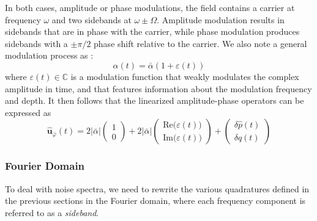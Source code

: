 In both cases, amplitude or phase modulations, the field contains a carrier at frequency $\omega$ and two sidebands at $\omega \pm \Omega$. Amplitude modulation results in sidebands that are in phase with the carrier, while phase modulation produces sidebands with a $\pm \pi/2$ phase shift relative to the carrier. We also note a general modulation process as :
\begin{equation}
\alpha(t) = \bar{\alpha} \left(1 + \varepsilon(t) \right)
\end{equation}
where $\varepsilon(t) \in \mathbb{C}$ is a modulation function that weakly modulates the complex amplitude in time, and that features information about the modulation frequency and depth. It then follows that the linearized amplitude-phase operators can be expressed as
\begin{equation}
\mathbf{\hat{\mathbf u}} _{\bar{\varphi}} (t) = 2|\bar{\alpha}| \begin{pmatrix}
  1 \\ 0 
\end{pmatrix} + 2|\bar{\alpha}|\begin{pmatrix}
  \mathrm{Re}\big(\varepsilon(t) \big) \\
  \mathrm{Im}\big(\varepsilon(t) \big)
\end{pmatrix}
+ \begin{pmatrix}
  \delta \hat{p}(t) \\
  \delta \hat{q}(t)
\end{pmatrix}
\end{equation}

\subsubsection{Fourier Domain}
To deal with noise spectra, we need to rewrite the various quadratures defined in the previous sections in the Fourier domain, where each frequency component is referred to as a \textit{sideband}.


